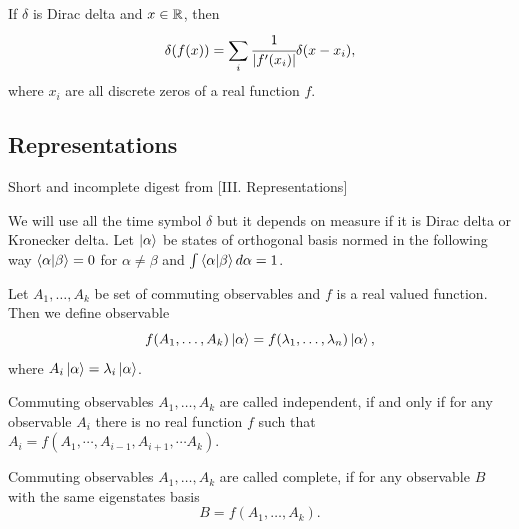 \documentclass[main.tex]{subfiles}
\begin{document}
\begin{corollary}
If $\delta$ is Dirac delta and $x\in \mathbb{R}$, then
\begin{equation}
\delta(f(x)) = \sum_i \cfrac{1}{|f'(x_i)|}\delta(x-x_i),
\end{equation}
where $x_i$ are all discrete zeros of a real function $f$.
\end{corollary}

\subsection{Representations}

Short and incomplete digest from \cite{dirac1981}[III. Representations]

We will use all the time symbol $\delta$ but it depends on measure if it is Dirac delta or Kronecker delta.  
Let $\ket{\alpha}$ be states of orthogonal basis normed in the following way $\bra{\alpha}\ket{\beta} = 0$ for $\alpha \not=\beta$ and $\int \bra{\alpha}\ket{\beta} d\alpha = 1$.
\begin{definition}
Let $A_1, \dots, A_k$ be set of commuting observables and $f$ is a real valued function. Then we define observable
\begin{equation}
f(A_1, \dots, A_k)\ket{\alpha} = f(\lambda_1, \dots, \lambda_n)\ket{\alpha},
\end{equation}
where $A_i \ket{\alpha} = \lambda_i \ket{\alpha}$.  
\end{definition}

\begin{definition}
Commuting observables $A_1, \dots, A_k$ are called independent, if and only if for any observable 
$A_i$ there is no real function $f$ such that $A_i = f(A_1, \cdots, A_{i-1}, A_{i+1}, \cdots A_k)$.
\end{definition}

\begin{definition}
Commuting observables $A_1, \dots, A_k$ are called complete, if for any observable $B$ with the same eigenstates basis 
\begin{equation}
B = f(A_1,  \dots, A_k).
\end{equation}
\end{definition}
\end{document}
